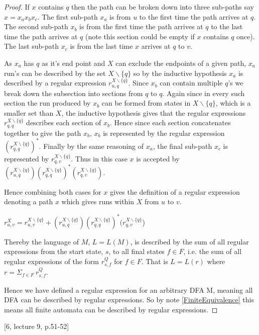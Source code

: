 \documentclass[a4paper,12pt]{report}
\theoremstyle{definition}
\begin{document}
\begin{proof}
If $x$ contains $q$ then the path can be broken down into three sub-paths say $x=x_ax_bx_c$. The first sub-path $x_a$ is from $u$ to the first time the path arrives at $q$. The second sub-path $x_b$ is from the first time the path arrives at $q$ to the last time the path arrives at $q$ (note this section could be empty if $x$ contains $q$ once). The last sub-path $x_c$ is from the last time $x$ arrives at $q$ to $v$. 

As $x_a$ has $q$ as it's end point and $X$ can exclude the endpoints of a given path, $x_a$ run's can be described by the set $X\backslash \{q\}$ so by the inductive hypothesis $x_a$ is described by a regular expression $r_{u,q}^{X\backslash\{q\}} $. Since $x_b$ can contain multiple $q$'s we break down the subsection into sections from $q$ to $q$. Again since in every such section the run produced by $x_b$ can be formed from states in $X\backslash\{q\}$, which is a smaller set than $X$, the inductive hypothesis gives that the regular expressions $r_{q,q}^{X\backslash\{q\}}$ describes each section of $x_b$. Hence since each section concatenates together to give the path $x_b$, $x_b$ is represented by the regular expression $( r_{q,q}^{X\backslash\{q\}})^*$.  Finally by the same reasoning of $x_a$, the final sub-path $x_c$ is represented by $ r_{q,v}^{X\backslash\{q\}}$. Thus in this case $x$ is accepted by  $(r_{u,q}^{X\backslash\{q\}} )( r_{q,q}^{X\backslash\{q\}})^*(r_{q,v}^{X\backslash\{q\}})$.

Hence combining both cases for $x$ gives the definition of a regular expression denoting a path $x$ which gives runs within $X$ from $u$ to $v$. 

$r_{u,v}^{X} = r_{u,v}^{X\backslash\{q\}} + (r_{u,q}^{X\backslash\{q\}} )( r_{q,q}^{X\backslash\{q\}})^*(r_{q,v}^{X\backslash\{q\}}$) 

Thereby the language of $M$, $L=L(M)$, is described by the sum of all regular expressions from the start state, $s$, to all final states $f\in F$, i.e. the sum of all regular expressions of the form $r_{s,f}^{Q} $ for $f\in F$. That is $L=L(r)$ where $r=\Sigma_{f\in F} \ r_{s,f}^Q$.

Hence we have defined a regular expression for an arbitrary DFA M, meaning all DFA can be described by regular expressions. So by note \ref{FiniteEquivalence} this means all finite automata can be described by regular expressions. 
\end{proof}
[6, lecture 9, p.51-52]
\end{document}
